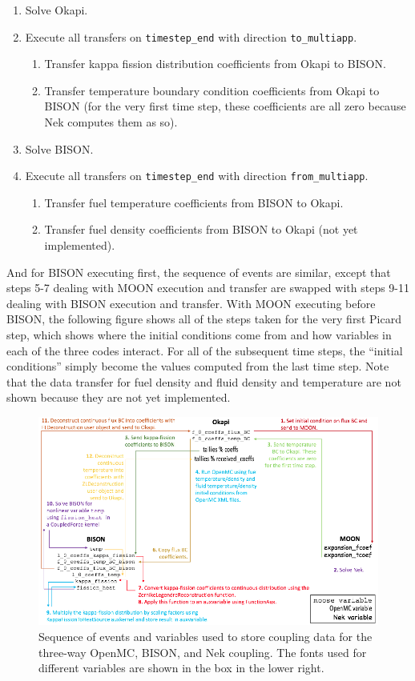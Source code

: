 \documentclass[10pt]{article}
\numberwithin{equation}{section} %
\begin{document}
\begin{enumerate}
\begin{enumerate}
	\end{enumerate}
\item Solve Okapi.
\item Execute all transfers on {\tt timestep\_end} with direction {\tt to\_multiapp}.
	\begin{enumerate}
	\item Transfer kappa fission distribution coefficients from Okapi to BISON.
	\item Transfer temperature boundary condition coefficients from Okapi to BISON (for the very first time step, these coefficients are all zero because Nek computes them as so).
	\end{enumerate}
\item Solve BISON.
\item Execute all transfers on {\tt timestep\_end} with direction {\tt from\_multiapp}.
	\begin{enumerate}
	\item Transfer fuel temperature coefficients from BISON to Okapi.
	\item Transfer fuel density coefficients from BISON to Okapi (not yet implemented).
	\end{enumerate}
\end{enumerate}

And for BISON executing first, the sequence of events are similar, except that steps 5-7 dealing with MOON execution and transfer are swapped with steps 9-11 dealing with BISON execution and transfer. With MOON executing before BISON, the following figure shows all of the steps taken for the very first Picard step, which shows where the initial conditions come from and how variables in each of the three codes interact. For all of the subsequent time steps, the ``initial conditions'' simply become the values computed from the last time step. Note that the data transfer for fuel density and fluid density and temperature are not shown because they are not yet implemented.

\begin{figure}[H]
\centering
\includegraphics[width=17.5cm]{figures/OpenMC-BISON-Nek-step1.png}
\caption{Sequence of events and variables used to store coupling data for the three-way OpenMC, BISON, and Nek coupling. The fonts used for different variables are shown in the box in the lower right.}
\end{figure}
\end{document}
